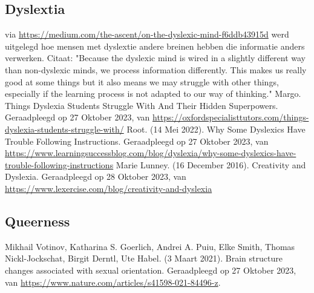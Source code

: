 \documentclass{article}
\begin{document}
\begin{thebibliography}{9}
        \item[\bigskip\subsection*{Dyslextia}]
                via \url{https://medium.com/the-ascent/on-the-dyslexic-mind-f6ddb43915d} werd uitgelegd hoe mensen met dyslextie andere breinen hebben die informatie anders verwerken. Citaat: "Because the dyslexic mind is wired in a slightly different way than non-dyslexic minds, we process information differently. This makes us really good at some things but it also means we may struggle with other things, especially if the learning process is not adapted to our way of thinking."    
                Margo. Things Dyslexia Students Struggle With And Their Hidden Superpowers.  Geraadpleegd op 27 Oktober 2023, van \url{https://oxfordspecialisttutors.com/things-dyslexia-students-struggle-with/}
                Root. (14 Mei 2022). Why Some Dyslexics Have Trouble Following Instructions. Geraadpleegd op 27 Oktober 2023, van \url{https://www.learningsuccessblog.com/blog/dyslexia/why-some-dyslexics-have-trouble-following-instructions}
                Marie Lunney. (16 December 2016). Creativity and Dyslexia. Geraadpleegd op 28 Oktober 2023, van \url{https://www.lexercise.com/blog/creativity-and-dyslexia}

        \item[\bigskip\subsection*{Queerness}]
                Mikhail Votinov, Katharina S. Goerlich, Andrei A. Puiu, Elke Smith, Thomas Nickl-Jockschat, Birgit Derntl, Ute Habel. (3 Maart 2021). Brain structure changes associated with sexual orientation. Geraadpleegd op 27 Oktober 2023, van \url{https://www.nature.com/articles/s41598-021-84496-z}.


\end{thebibliography}
\end{document}
